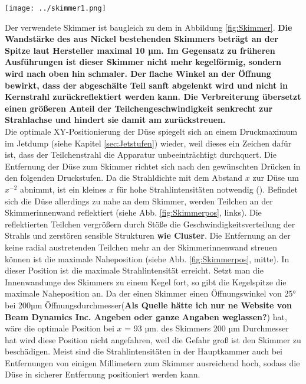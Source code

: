\begin{center}
\begin{minipage}{\linewidth}
\centering
\texttt{[image: ../skimmer1.png]}%
 \label{fig:Skimmer}
\end{minipage} 
\end{center} 
Der verwendete Skimmer ist baugleich zu dem in Abbildung \ref{fig:Skimmer}. \textbf{Die Wandstärke des aus Nickel bestehenden Skimmers beträgt an der Spitze laut Hersteller maximal 10 µm. Im Gegensatz zu früheren Ausführungen ist dieser Skimmer nicht mehr kegelförmig, sondern wird nach oben hin schmaler. Der flache Winkel an der Öffnung bewirkt, dass der abgeschälte Teil sanft abgelenkt wird und nicht in Kernstrahl zurückreflektiert werden kann. Die Verbreiterung übersetzt einen größeren Anteil der Teilchengeschwindigkeit senkrecht zur Strahlachse und hindert sie damit am zurückstreuen.} \\
Die optimale XY-Positionierung der Düse spiegelt sich an einem Druckmaximum im Jetdump (siehe Kapitel \ref{sec:Jetstufen}) wieder, weil dieses ein Zeichen dafür ist, dass der Teilchenstrahl die Apparatur unbeeinträchtigt durchquert. Die Entfernung der Düse zum Skimmer richtet sich nach den gewünschten Drücken in den folgenden Druckstufen. Da die Strahldichte mit dem Abstand $x$ zur Düse um $x^{-2}$ abnimmt, ist ein kleines $x$ für hohe Strahlintensitäten notwendig  (\cite{hagena1981nucleation}). Befindet sich die Düse allerdings zu nahe an dem Skimmer, werden Teilchen an der Skimmerinnenwand reflektiert (siehe Abb. \ref{fig:Skimmerpos}, links). Die reflektierten Teilchen vergrößern durch Stöße die Geschwindigkeitsverteilung der Strahls und zerstören sensible Strukturen \textbf{wie Cluster}. Die Entfernung an der keine radial austretenden Teilchen mehr an der Skimmerinnenwand streuen können ist die maximale Naheposition (siehe Abb. \ref{fig:Skimmerpos}, mitte). In dieser Position ist die maximale Strahlintensität erreicht. Setzt man die Innenwandunge des Skimmers zu einem Kegel fort, so gibt die Kegelspitze die maximale Naheposition an. Da der einen Skimmer einen Öffnungswinkel von 25° bei 200µm Öffnungsdurchmesser(\textbf{Als Quelle hätte ich nur ne Website von Beam Dynamics Inc. Angeben oder ganze Angaben weglassen?}) hat, wäre die optimale Position bei $x$ = 93 µm.  
des Skimmers  200 µm Durchmesser hat  wird diese Position nicht angefahren, weil die Gefahr groß ist den Skimmer zu beschädigen. 
Meist sind die Strahlintensitäten in der Hauptkammer auch bei Entfernungen von einigen Millimetern zum Skimmer ausreichend hoch, sodass die Düse in sicherer Entfernung positioniert werden kann.  
 
